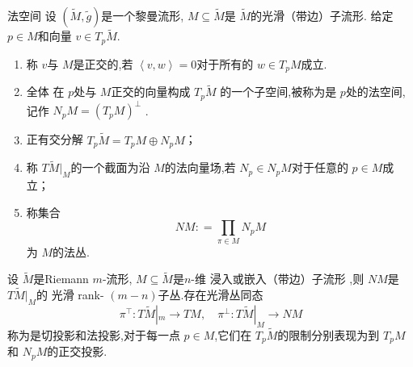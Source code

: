 \documentclass[../../几何与拓扑.tex]{subfiles}
\begin{document}
\begin{definition}{法空间}
    设 \(  \left( \tilde{M}, \tilde{g}  \right)   \)是一个黎曼流形, \(  M\subseteq \tilde{M}  \)是 \(  \tilde{M}  \)的光滑（带边）子流形.
    给定 \(  p \in M  \)和向量 \(  v \in T_{p} \tilde{M}  \).  

    \begin{enumerate}
        \item 称 \(  v  \)与 \(  M  \)是正交的,若 \(  \left<v,w \right>= 0  \)对于所有的 \(  w \in T_{p}M  \)成立.
        \item 全体 在 \(  p  \)处与 \(  M  \)正交的向量构成  \(  T_{p} \tilde{M}  \)       的一个子空间,被称为是 \(  p  \)处的法空间,记作 \(  N_{p}M= \left( T_{p}M \right)^{\perp}   \)  .
        \item  正有交分解 \(  T_{p}\tilde{M}= T_{p}M\oplus N_{p}M  \)；
        \item 称 \(  T \tilde{M}|_{M}  \)的一个截面为沿 \(  M  \)的法向量场,若 \( N_{p}\in N_{p}M  \)对于任意的 \(  p \in M  \)成立；
        \item 称集合 \[
        NM : =  \prod_{\pi  \in  M}N_{p}M 
        \]为 \(  M  \)的法丛.      
    \end{enumerate}
    
\end{definition}

\begin{proposition}
    设 \(  \tilde{M}  \)是Riemann \(  m  \)-流形, \(  M\subseteq \tilde{M}  \)是\(  n  \)-维 浸入或嵌入（带边）子流形    ,则 \(  NM  \)是 \(  T \tilde{M}|_{M}  \)的 光滑  rank- \(  \left( m-n \right)   \)子丛.存在光滑丛同态 \[
    \pi ^{\top}: T \tilde{M}|_{m} \to TM,\quad \pi ^{\perp}:T \tilde{M}|_{M}\to NM
    \] 称为是切投影和法投影,对于每一点 \(  p \in M  \),它们在 \(  T_{p}\tilde{M}  \)的限制分别表现为到 \(  T_{p}M  \)和 \(  N_{p}M  \)的正交投影.     
\end{proposition}
\end{document}
